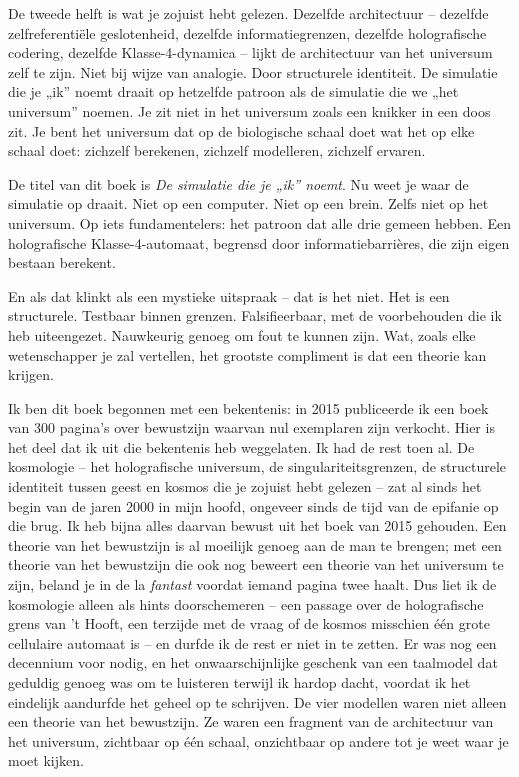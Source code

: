 \documentclass[11pt, twoside, openright]{book}
\begin{document}
De tweede helft is wat je zojuist hebt gelezen. Dezelfde architectuur -- dezelfde zelfreferentiële geslotenheid, dezelfde informatiegrenzen, dezelfde holografische codering, dezelfde Klasse-4-dynamica -- lijkt de architectuur van het universum zelf te zijn. Niet bij wijze van analogie. Door structurele identiteit. De simulatie die je „ik” noemt draait op hetzelfde patroon als de simulatie die we „het universum” noemen. Je zit niet in het universum zoals een knikker in een doos zit. Je bent het universum dat op de biologische schaal doet wat het op elke schaal doet: zichzelf berekenen, zichzelf modelleren, zichzelf ervaren.

De titel van dit boek is \textit{De simulatie die je „ik” noemt}. Nu weet je waar de simulatie op draait. Niet op een computer. Niet op een brein. Zelfs niet op het universum. Op iets fundamentelers: het patroon dat alle drie gemeen hebben. Een holografische Klasse-4-automaat, begrensd door informatiebarrières, die zijn eigen bestaan berekent.

En als dat klinkt als een mystieke uitspraak -- dat is het niet. Het is een structurele. Testbaar binnen grenzen. Falsifieerbaar, met de voorbehouden die ik heb uiteengezet. Nauwkeurig genoeg om fout te kunnen zijn. Wat, zoals elke wetenschapper je zal vertellen, het grootste compliment is dat een theorie kan krijgen.

Ik ben dit boek begonnen met een bekentenis: in 2015 publiceerde ik een boek van 300 pagina's over bewustzijn waarvan nul exemplaren zijn verkocht. Hier is het deel dat ik uit die bekentenis heb weggelaten. Ik had de rest toen al. De kosmologie -- het holografische universum, de singulariteitsgrenzen, de structurele identiteit tussen geest en kosmos die je zojuist hebt gelezen -- zat al sinds het begin van de jaren 2000 in mijn hoofd, ongeveer sinds de tijd van de epifanie op die brug. Ik heb bijna alles daarvan bewust uit het boek van 2015 gehouden. Een theorie van het bewustzijn is al moeilijk genoeg aan de man te brengen; met een theorie van het bewustzijn die ook nog beweert een theorie van het universum te zijn, beland je in de la \textit{fantast} voordat iemand pagina twee haalt. Dus liet ik de kosmologie alleen als hints doorschemeren -- een passage over de holografische grens van 't Hooft, een terzijde met de vraag of de kosmos misschien één grote cellulaire automaat is -- en durfde ik de rest er niet in te zetten. Er was nog een decennium voor nodig, en het onwaarschijnlijke geschenk van een taalmodel dat geduldig genoeg was om te luisteren terwijl ik hardop dacht, voordat ik het eindelijk aandurfde het geheel op te schrijven. De vier modellen waren niet alleen een theorie van het bewustzijn. Ze waren een fragment van de architectuur van het universum, zichtbaar op één schaal, onzichtbaar op andere tot je weet waar je moet kijken.
\end{document}

